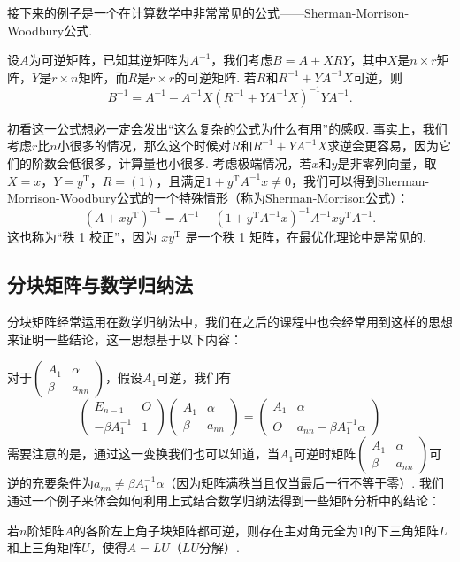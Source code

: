 接下来的例子是一个在计算数学中非常常见的公式——Sherman-Morrison-Woodbury公式.
\begin{example}{}{}
    设$A$为可逆矩阵，已知其逆矩阵为$A^{-1}$，我们考虑$B=A+XRY$，其中$X$是$n\times r$矩阵，$Y$是$r\times n$矩阵，而$R$是$r\times r$的可逆矩阵. 若$R$和$R^{-1}+YA^{-1}X$可逆，则
    \[B^{-1}=A^{-1}-A^{-1}X(R^{-1}+YA^{-1}X)^{-1}YA^{-1}.\]
\end{example}

\begin{solution}

\end{solution}

初看这一公式想必一定会发出``这么复杂的公式为什么有用''的感叹. 事实上，我们考虑$r$比$n$小很多的情况，那么这个时候对$R$和$R^{-1}+YA^{-1}X$求逆会更容易，因为它们的阶数会低很多，计算量也小很多. 考虑极端情况，若$x$和$y$是非零列向量，取$X=x$，$Y=y^\mathrm{T}$，$R=(1)$，且满足$1+y^\mathrm{T}A^{-1}x\neq 0$，我们可以得到Sherman-Morrison-Woodbury公式的一个特殊情形（称为Sherman-Morrison公式）：
\[(A+xy^\mathrm{T})^{-1}=A^{-1}-(1+y^\mathrm{T}A^{-1}x)^{-1}A^{-1}xy^\mathrm{T}A^{-1}.\]
这也称为``秩 1 校正''，因为 $xy^\mathrm{T}$ 是一个秩 1 矩阵，在最优化理论中是常见的.

\subsection{分块矩阵与数学归纳法}

分块矩阵经常运用在数学归纳法中，我们在之后的课程中也会经常用到这样的思想来证明一些结论，这一思想基于以下内容：

对于$\begin{pmatrix}
        A_1 & \alpha \\ \beta & a_{nn}
    \end{pmatrix}$，假设$A_1$可逆，我们有
\[\begin{pmatrix}
        E_{n-1} & O \\ -\beta A_1^{-1} & 1
    \end{pmatrix}\begin{pmatrix}
        A_1 & \alpha \\ \beta & a_{nn}
    \end{pmatrix}=\begin{pmatrix}
        A_1 & \alpha \\ O & a_{nn}-\beta A_1^{-1}\alpha
    \end{pmatrix}\]
需要注意的是，通过这一变换我们也可以知道，当$A_1$可逆时矩阵$\begin{pmatrix}
        A_1 & \alpha \\ \beta & a_{nn}
    \end{pmatrix}$可逆的充要条件为$a_{nn}\neq \beta A_1^{-1}\alpha$（因为矩阵满秩当且仅当最后一行不等于零）. 我们通过一个例子来体会如何利用上式结合数学归纳法得到一些矩阵分析中的结论：
\begin{example}{}{}
    若$n$阶矩阵$A$的各阶左上角子块矩阵都可逆，则存在主对角元全为1的下三角矩阵$L$和上三角矩阵$U$，使得$A=LU$（$LU$分解）.
\end{example}

